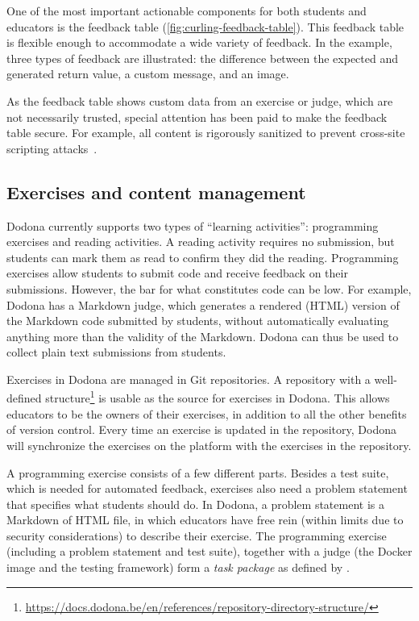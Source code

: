 \documentclass[../main]{subfiles}
\begin{document}
One of the most important actionable components for both students and educators is the feedback table (\cref{fig:curling-feedback-table}).
This feedback table is flexible enough to accommodate a wide variety of feedback.
In the example, three types of feedback are illustrated: the difference between the expected and generated return value, a custom message, and an image.

As the feedback table shows custom data from an exercise or judge, which are not necessarily trusted, special attention has been paid to make the feedback table secure.
For example, all content is rigorously sanitized to prevent cross-site scripting attacks~\autocite{guptaCrossSiteScriptingXSS2017}.

\subsection{Exercises and content management}\label{subsec:exercises-and-content-management}

Dodona currently supports two types of ``learning activities'': programming exercises and reading activities.
A reading activity requires no submission, but students can mark them as read to confirm they did the reading.
Programming exercises allow students to submit code and receive feedback on their submissions.
However, the bar for what constitutes code can be low.
For example, Dodona has a Markdown judge, which generates a rendered (HTML) version of the Markdown code submitted by students, without automatically evaluating anything more than the validity of the Markdown.
Dodona can thus be used to collect plain text submissions from students.

Exercises in Dodona are managed in Git repositories.
A repository with a well-defined structure\footnote{\url{https://docs.dodona.be/en/references/repository-directory-structure/}} is usable as the source for exercises in Dodona.
This allows educators to be the owners of their exercises, in addition to all the other benefits of version control.
Every time an exercise is updated in the repository, Dodona will synchronize the exercises on the platform with the exercises in the repository.

A programming exercise consists of a few different parts.
Besides a test suite, which is needed for automated feedback, exercises also need a problem statement that specifies what students should do.
In Dodona, a problem statement is a Markdown of HTML file, in which educators have free rein (within limits due to security considerations) to describe their exercise.
The programming exercise (including a problem statement and test suite), together with a judge (the Docker image and the testing framework) form a \emph{task package} as defined by \textcite{verhoeffProgrammingTaskPackages2008}.
\end{document}
